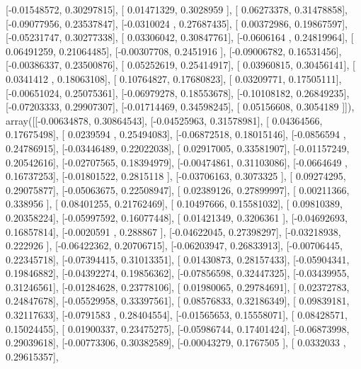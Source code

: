 \documentclass{article}
\begin{document}
       [-0.01548572,  0.30297815],
       [ 0.01471329,  0.3028959 ],
       [ 0.06273378,  0.31478858],
       [-0.09077956,  0.23537847],
       [-0.0310024 ,  0.27687435],
       [ 0.00372986,  0.19867597],
       [-0.05231747,  0.30277338],
       [ 0.03306042,  0.30847761],
       [-0.0606164 ,  0.24819964],
       [ 0.06491259,  0.21064485],
       [-0.00307708,  0.2451916 ],
       [-0.09006782,  0.16531456],
       [-0.00386337,  0.23500876],
       [ 0.05252619,  0.25414917],
       [ 0.03960815,  0.30456141],
       [ 0.0341412 ,  0.18063108],
       [ 0.10764827,  0.17680823],
       [ 0.03209771,  0.17505111],
       [-0.00651024,  0.25075361],
       [-0.06979278,  0.18553678],
       [-0.10108182,  0.26849235],
       [-0.07203333,  0.29907307],
       [-0.01714469,  0.34598245],
       [ 0.05156608,  0.3054189 ]]), array([[-0.00634878,  0.30864543],
       [-0.04525963,  0.31578981],
       [ 0.04364566,  0.17675498],
       [ 0.0239594 ,  0.25494083],
       [-0.06872518,  0.18015146],
       [-0.0856594 ,  0.24786915],
       [-0.03446489,  0.22022038],
       [ 0.02917005,  0.33581907],
       [-0.01157249,  0.20542616],
       [-0.02707565,  0.18394979],
       [-0.00474861,  0.31103086],
       [-0.0664649 ,  0.16737253],
       [-0.01801522,  0.2815118 ],
       [-0.03706163,  0.3073325 ],
       [ 0.09274295,  0.29075877],
       [-0.05063675,  0.22508947],
       [ 0.02389126,  0.27899997],
       [ 0.00211366,  0.338956  ],
       [ 0.08401255,  0.21762469],
       [ 0.10497666,  0.15581032],
       [ 0.09810389,  0.20358224],
       [-0.05997592,  0.16077448],
       [ 0.01421349,  0.3206361 ],
       [-0.04692693,  0.16857814],
       [-0.0020591 ,  0.288867  ],
       [-0.04622045,  0.27398297],
       [-0.03218938,  0.222926  ],
       [-0.06422362,  0.20706715],
       [-0.06203947,  0.26833913],
       [-0.00706445,  0.22345718],
       [-0.07394415,  0.31013351],
       [ 0.01430873,  0.28157433],
       [-0.05904341,  0.19846882],
       [-0.04392274,  0.19856362],
       [-0.07856598,  0.32447325],
       [-0.03439955,  0.31246561],
       [-0.01284628,  0.23778106],
       [ 0.01980065,  0.29784691],
       [ 0.02372783,  0.24847678],
       [-0.05529958,  0.33397561],
       [ 0.08576833,  0.32186349],
       [ 0.09839181,  0.32117633],
       [-0.0791583 ,  0.28404554],
       [-0.01565653,  0.15558071],
       [ 0.08428571,  0.15024455],
       [ 0.01900337,  0.23475275],
       [-0.05986744,  0.17401424],
       [-0.06873998,  0.29039618],
       [-0.00773306,  0.30382589],
       [-0.00043279,  0.1767505 ],
       [ 0.0332033 ,  0.29615357],
\end{document}
